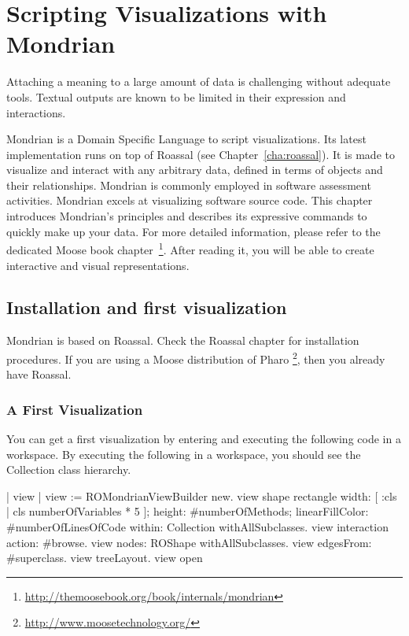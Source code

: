 \documentclass[a4paper,10pt,twoside]{book}
\begin{document}
\fi
\sloppy
\chapter{Scripting Visualizations with Mondrian}

\indent

Attaching a meaning to a large amount of data is challenging without adequate tools. Textual outputs are known to be limited in their expression and interactions. 

Mondrian is a Domain Specific Language to script visualizations. Its latest implementation runs on top of Roassal (see Chapter~\ref{cha:roassal}).  
It is made to visualize and interact with any arbitrary data, defined in terms of objects and their relationships. Mondrian is commonly employed in software assessment activities. Mondrian excels at visualizing software source code. 
This chapter introduces Mondrian's principles and describes its expressive commands to quickly make up your data. For more detailed information, please refer to the dedicated Moose book chapter~\footnote{\url{http://themoosebook.org/book/internals/mondrian}}.
After reading it, you will be able to create interactive and visual representations.


\section{Installation and first visualization}

Mondrian is based on Roassal. Check the Roassal chapter for installation procedures. If you are using a Moose distribution of Pharo \footnote{\url{http://www.moosetechnology.org/}}, then you already have Roassal. 

\subsection{A First Visualization}
You can get a first visualization by entering and executing the following code in a workspace. By executing the following in a workspace, you should see the Collection class hierarchy.

\begin{code}{}
| view |
view := ROMondrianViewBuilder new.
view shape rectangle 
	width:  [ :cls | cls numberOfVariables * 5 ];  
	height: #numberOfMethods;
	linearFillColor: #numberOfLinesOfCode within:  Collection withAllSubclasses.
view interaction action: #browse.
view nodes: ROShape withAllSubclasses.
view edgesFrom: #superclass.
view treeLayout.
view open
\end{code}
\end{document}
